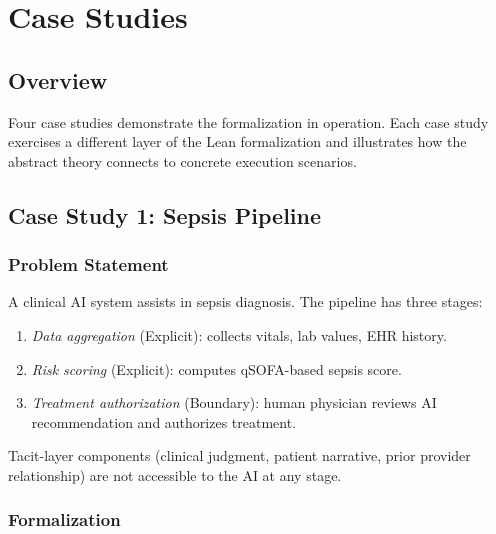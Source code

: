 \section{Case Studies}
\label{ch:cases}

\subsection{Overview}

Four case studies demonstrate the formalization in operation. Each case study
exercises a different layer of the Lean formalization and illustrates how the
abstract theory connects to concrete execution scenarios.

\subsection{Case Study 1: Sepsis Pipeline}


\subsubsection*{Problem Statement}

A clinical AI system assists in sepsis diagnosis. The pipeline has three stages:
\begin{enumerate}
  \item \textit{Data aggregation} (Explicit): collects vitals, lab values, EHR
        history.
  \item \textit{Risk scoring} (Explicit): computes qSOFA-based sepsis score.
  \item \textit{Treatment authorization} (Boundary): human physician reviews AI
        recommendation and authorizes treatment.
\end{enumerate}

Tacit-layer components (clinical judgment, patient narrative, prior provider
relationship) are not accessible to the AI at any stage.

\subsubsection*{Formalization}

